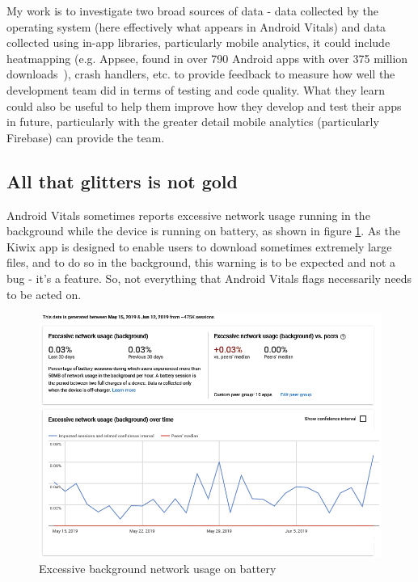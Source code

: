 My work is to investigate two broad sources of data - data collected by the operating system (here effectively what appears in Android Vitals) and data collected using in-app libraries, particularly mobile analytics, it could include heatmapping (e.g. Appsee, found in over 790 Android apps with over 375 million downloads~\cite{appbrain_appsee}), crash handlers, etc. to provide feedback to measure how well the development team did in terms of testing and code quality. What they learn could also be useful to help them improve how they develop and test their apps in future, particularly with the greater detail mobile analytics (particularly Firebase) can provide the team.

\subsection{All that glitters is not gold}
Android Vitals sometimes reports excessive network usage running in the background while the device is running on battery, as shown in figure \ref{fig:android_vitals_excessive_network_usage}. As the Kiwix app is designed to enable users to download sometimes extremely large files, and to do so in the background, this warning is to be expected and not a bug - it's a feature. So, not everything that Android Vitals flags necessarily needs to be acted on. %


\begin{figure}[!htbp]
    \centering
    \includegraphics[width=\textwidth, keepaspectratio]{images/android-vitals-screenshots/Excessive_network_usage_by_kiwix_15_jun_2019.png}
    \caption{Excessive background network usage on battery}
    \label{fig:android_vitals_excessive_network_usage}
\end{figure}

